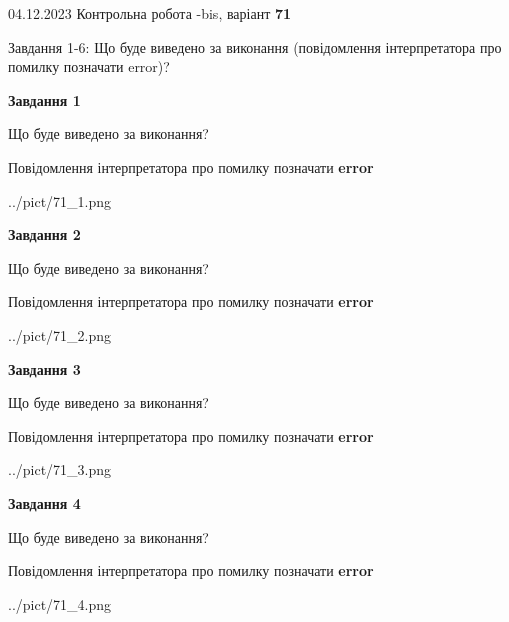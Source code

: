 \documentclass[12pt, ukrainian]{article}
\begin{document}
{{04.12.2023 Контрольна робота -bis, варіант  \No \textbf { 71 }\par}}
{

Завдання 1-6: Що буде виведено за виконання (повідомлення інтерпретатора про помилку позначати error)?


{\begin {center}\textbf{Завдання 1}\end {center}}\par
Що буде виведено за виконання? \par
Повідомлення інтерпретатора про помилку позначати \textbf{error}

\begin{center}
	{../pict/71_1.png}
\end{center}
\newpage

{\begin {center}\textbf{Завдання 2}\end {center}}\par
Що буде виведено за виконання? \par
Повідомлення інтерпретатора про помилку позначати \textbf{error}

\begin{center}
	{../pict/71_2.png}
\end{center}
\newpage

{\begin {center}\textbf{Завдання 3}\end {center}}\par
Що буде виведено за виконання? \par
Повідомлення інтерпретатора про помилку позначати \textbf{error}

\begin{center}
	{../pict/71_3.png}
\end{center}
\newpage

{\begin {center}\textbf{Завдання 4}\end {center}}\par
Що буде виведено за виконання? \par
Повідомлення інтерпретатора про помилку позначати \textbf{error}

\begin{center}
	{../pict/71_4.png}
\end{center}
\newpage

}
\end{document}
